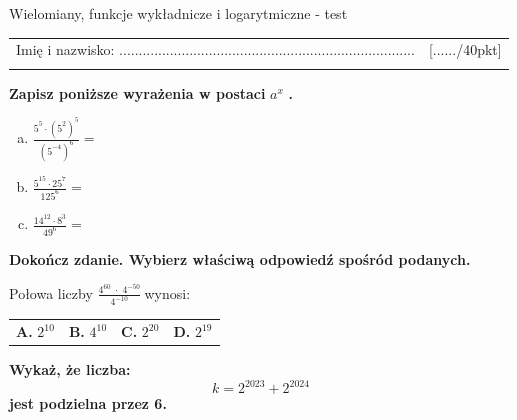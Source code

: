 \documentclass[12pt,a4paper]{article}
\theoremstyle{break}
\begin{document}
	
	\begin{center}
		\LARGE Wielomiany, funkcje wykładnicze i logarytmiczne - test
	\end{center}
	
	\begin{tabular}{p{13cm} r}
		Imię i nazwisko: ............................................................................
		&[....../40pkt]\\ 
		\vspace{0.5cm}
	\end{tabular}
	
	\begin{zad}[0-3]
		\textbf{Zapisz poniższe wyrażenia w postaci} $a^x$ \textbf{.}
	\end{zad} 
	
	\begin{enumerate}[a)]\Large
		\item $\frac{5^5\cdot(5^2)^5}{(5^{-4})^6}=$
		\item $\frac{5^{15}\cdot25^7}{125^6}=$
		\item $\frac{14^{12}\cdot8^3}{49^6}=$
	\end{enumerate}
	
	
	\begin{zad}[0-1]
		\textbf{Dokończ zdanie. Wybierz właściwą odpowiedź spośród podanych.}
	\end{zad} 
	
	Połowa liczby \Large$\frac{4^{60}\;\cdot\;4^{-50}}{4^{-10}}\:$\normalsize wynosi:
	
	\vspace{0.5cm}
	\begin{tabular}{p{3.5cm} p{3.5cm} p{3.5cm} p{3.5cm}}
		\textbf{A. }$2^{10}$&
		\textbf{B. }$4^{10}$&
		\textbf{C. }$2^{20}$&
		\textbf{D. }$2^{19}$\\
	\end{tabular}
	
	
	\begin{zad}[0-3]
		\textbf{Wykaż, że liczba:}
		$$k=2^{2023}+2^{2024}$$
		\textbf{jest podzielna przez 6.}
	\end{zad} 
	
\end{document}

